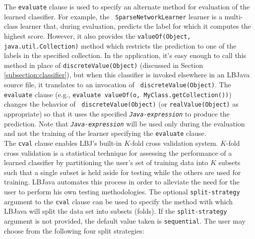 The {\tt evaluate} clause is used to specify an alternate method for
evaluation of the learned classifier.  For example, the {\tt
SparseNetworkLearner} learner is a multi-class learner that, during
evaluation, predicts the label for which it computes the highest score.
However, it also provides the {\tt valueOf(Object, java.util.Collection)}
method which restricts the prediction to one of the labels in the specified
collection.  In the application, it's easy enough to call this method in place
of {\tt discreteValue(Object)} (discussed in Section
\ref{subsection:classifier}), but when this classifier is invoked elsewhere in
an LBJava source file, it translates to an invocation of {\tt
discreteValue(Object)}.  The {\tt evaluate} clause (e.g., {\tt evaluate
valueOf(o, MyClass.getCollection())}) changes the behavior of {\tt
discreteValue(Object)} (or {\tt realValue(Object)} as appropriate) so that it
uses the specified {\tt\emph{Java-expression}} to produce the prediction.
Note that {\tt\emph{Java-expression}} will be used only during the evaluation
and not the training of the learner specifying the {\tt evaluate} clause. \\

The {\tt cval} clause enables LBJ's built-in $K$-fold cross validation system.
$K$-fold cross validation is a statistical technique for assessing the
performance of a learned classifier by partitioning the user's set of training
data into $K$ subsets such that a single subset is held aside for testing
while the others are used for training. LBJava automates this process in order to
alleviate the need for the user to perform his own testing methodologies. The
optional {\tt split-strategy} argument to the {\tt cval} clause can be used to
specify the method with which LBJava will split the data set into subsets
(folds). If the {\tt split-strategy} argument is not provided, the default
value taken is {\tt sequential}. The user may choose from the following four
split strategies:

